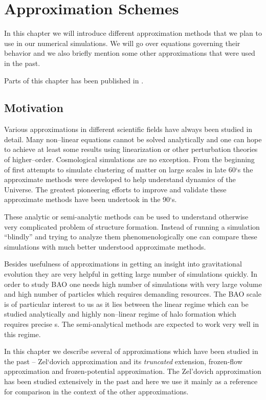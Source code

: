 \chapter{Approximation Schemes}
\label{chpt:app_schemes}
In this chapter we will introduce different approximation methods that we plan to use in our numerical simulations. We will go over equations governing their behavior and we also briefly mention some other approximations that were used in the past.

Parts of this chapter has been published in \textcite{2020MNRAS.493.2085V}.

\section{Motivation}
Various approximations in different scientific fields have always been studied in detail. Many non--linear equations cannot be solved analytically and one can hope to achieve at least some results using linearization or other perturbation theories of higher--order. Cosmological simulations are no exception. From the beginning of first attempts to simulate clustering of matter on large scales in late 60`s the approximate methods were developed to help understand dynamics of the Universe. The greatest pioneering efforts to improve and validate these approximate methods have been undertook in the 90`s.

These analytic or semi-analytic methods can be used to understand otherwise very complicated problem of structure formation. Instead of running a simulation ``blindly'' and trying to analyze them phenomenologically one can compare these simulations with much better understood approximate methods.

Besides usefulness of approximations in getting an insight into gravitational evolution they are very helpful in getting large number of simulations quickly. In order to study BAO one needs high number of simulations with very large volume and high number of particles which requires demanding resources. The BAO scale is of particular interest to us as it lies between the linear regime which can be studied analytically and highly non--linear regime of halo formation which requires precise \nbodysim s. The semi-analytical methods are expected to work very well in this regime.

In this chapter we describe several of approximations which have been studied in the past -- Zel`dovich approximation and its \textit{truncated} extension, frozen-flow approximation and frozen-potential approximation. The Zel'dovich approximation has been studied extensively in the past and here we use it mainly as a reference for comparison in the context of the other approximations.

